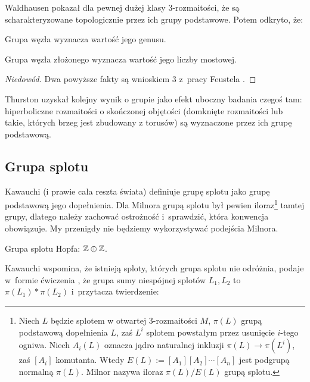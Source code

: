Waldhausen \cite{waldhausen1968} pokazał dla pewnej dużej klasy 3-rozmaitości, że są scharakteryzowane topologicznie przez ich grupy podstawowe.
%
Potem odkryto, że:

\begin{proposition}
    Grupa węzła wyznacza wartość jego genusu.
\end{proposition}

\begin{proposition}
    Grupa węzła złożonego wyznacza wartość jego liczby mostowej.
\end{proposition}

\begin{proof}[Niedowód]
    Dwa powyższe fakty są wnioskiem 3 z~pracy Feustela \cite{feustel1978}.
\end{proof}

Thurston \cite{thurston1982} uzyskał kolejny wynik o grupie jako efekt uboczny badania czegoś tam: hiperboliczne rozmaitości o skończonej objętości (domknięte rozmaitości lub takie, których brzeg jest zbudowany z torusów) są wyznaczone przez ich grupę podstawową.
%

\subsection{Grupa splotu}

Kawauchi \cite[s. 73]{kawauchi1996} (i prawie cała reszta świata) definiuje grupę splotu jako grupę podstawową jego dopełnienia.
Dla Milnora \cite{milnor1954} grupą splotu był pewien iloraz\footnote{%
Niech $L$ będzie splotem w otwartej 3-rozmaitości $M$, $\pi(L)$ grupą podstawową dopełnienia $L$, zaś $L^i$ splotem powstałym przez usunięcie $i$-tego ogniwa.
Niech $A_i(L)$ oznacza jądro naturalnej inkluzji $\pi(L) \to \pi(L^i)$, zaś $[A_i]$ komutanta.
Wtedy $E(L) := [A_1][A_2] \cdots [A_n]$ jest podgrupą normalną $\pi(L)$.
Milnor nazywa iloraz $\pi(L) / E(L)$ grupą splotu.%
} tamtej grupy, dlatego należy zachować ostrożność i~sprawdzić, która konwencja obowiązuje.
My przenigdy nie będziemy wykorzystywać podejścia Milnora.

\begin{example}
    Grupa splotu Hopfa: $\mathbb Z \oplus \mathbb Z$.
\end{example}

Kawauchi wspomina, że istnieją sploty, których grupa splotu nie odróżnia, podaje w~formie ćwiczenia \cite[s. 73]{kawauchi1996}, że grupa sumy niespójnej splotów $L_1, L_2$ to $\pi(L_1) * \pi(L_2)$ i~przytacza twierdzenie:

